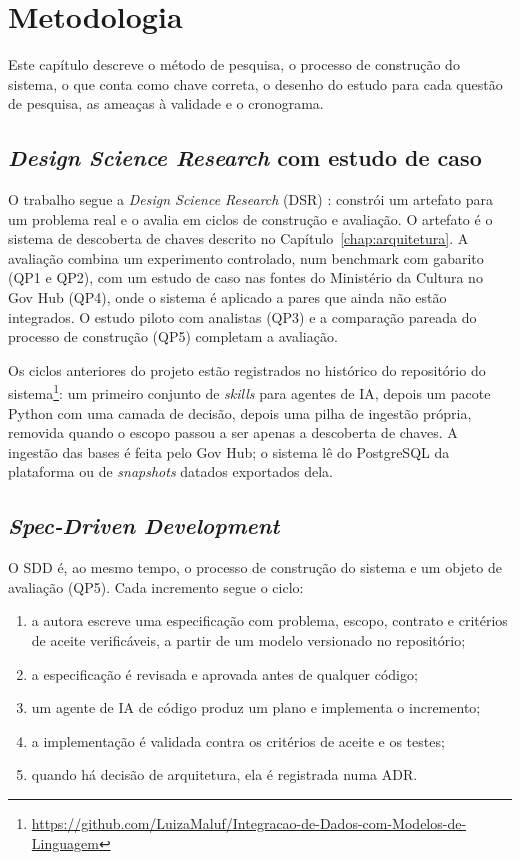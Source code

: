 \chapter{Metodologia}
\label{chap:metodologia}

Este capítulo descreve o método de pesquisa, o processo de construção do
sistema, o que conta como chave correta, o desenho do estudo para cada
questão de pesquisa, as ameaças à validade e o cronograma.

\section{\emph{Design Science Research} com estudo de caso}
\label{sec:metodologia-design-science-research-com-estudo-de-caso}

O trabalho segue a \emph{Design Science Research} (DSR)
\cite{hevner2004design,wieringa2014design}: constrói um artefato para um
problema real e o avalia em ciclos de construção e avaliação. O artefato é o
sistema de descoberta de chaves descrito no Capítulo~\ref{chap:arquitetura}.
A avaliação combina um experimento controlado, num benchmark com gabarito
(QP1 e QP2), com um estudo de caso \cite{runeson2009case} nas fontes do
Ministério da Cultura no Gov Hub (QP4), onde o sistema é aplicado a pares que
ainda não estão integrados. O estudo piloto com analistas (QP3) e a
comparação pareada do processo de construção (QP5) completam a avaliação.

Os ciclos anteriores do projeto estão registrados no histórico do
repositório do sistema\footnote{\url{https://github.com/LuizaMaluf/Integracao-de-Dados-com-Modelos-de-Linguagem}}:
um primeiro conjunto de \emph{skills} para agentes de IA, depois um pacote
Python com uma camada de decisão, depois uma pilha de ingestão própria,
removida quando o escopo passou a ser apenas a descoberta de chaves. A
ingestão das bases é feita pelo Gov Hub; o sistema lê do PostgreSQL da
plataforma ou de \emph{snapshots} datados exportados dela.

\section{\emph{Spec-Driven Development}}
\label{sec:metodologia-spec-driven-development}

O SDD é, ao mesmo tempo, o processo de construção do sistema e um objeto de
avaliação (QP5). Cada incremento segue o ciclo:

\begin{enumerate}
\item a autora escreve uma especificação com problema, escopo, contrato e
critérios de aceite verificáveis, a partir de um modelo versionado no
repositório;
\item a especificação é revisada e aprovada antes de qualquer código;
\item um agente de IA de código produz um plano e implementa o incremento;
\item a implementação é validada contra os critérios de aceite e os testes;
\item quando há decisão de arquitetura, ela é registrada numa ADR.
\end{enumerate}

